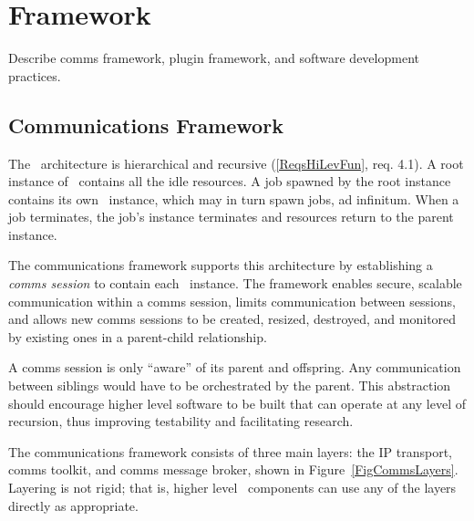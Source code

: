 \section{Framework}

Describe comms framework, plugin framework, and software
development practices.

\subsection{Communications Framework}\label{SecComms}

The \ngrm\ architecture is hierarchical and recursive
(\ref{ReqsHiLevFun}, req. 4.1).
A root instance of \ngrm\ contains all the
idle resources.  A job spawned by the root instance contains
its own \ngrm\ instance, which may in turn spawn jobs, ad infinitum.
When a job terminates, the job's instance terminates and resources
return to the parent instance.

The communications framework supports this architecture by
establishing a {\em comms session} to contain each \ngrm\ instance.
The framework enables secure, scalable communication
within a comms session, limits communication between sessions,
and allows new comms sessions to be created, resized, destroyed,
and monitored by existing ones in a parent-child relationship.

A comms session is only ``aware'' of its parent and offspring.
Any communication between siblings would have to be orchestrated by
the parent.  This abstraction should encourage higher level software
to be built that can operate at any level of recursion, thus improving
testability and facilitating research.

The communications framework consists of three main layers:
the IP transport, comms toolkit, and comms message broker, shown
in Figure~\ref{FigCommsLayers}.  Layering is not rigid;
that is, higher level \ngrm\ components can use any of the
layers directly as appropriate.

